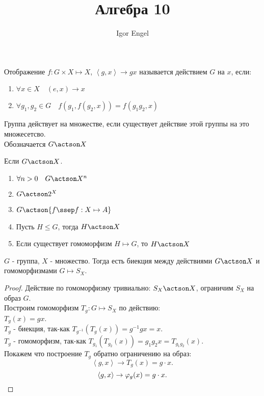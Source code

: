\documentclass[11pt, oneside]{article}   	%
\title{Алгебра 10}
\author{Igor Engel}
\date{}
\begin{document}
\maketitle
\section{} 
    \begin{definition}
        Отображение $f : G \times X \mapsto X$, $\left<g, x\right> \to gx$ называется действием $G$ на $x$, если:
        \begin{enumerate}
            \item $\forall{x\in X}\quad (e, x) \to x$
            \item $\forall{g_1, g_2\in G}\quad f(g_1, f(g_2, x)) = f(g_1g_2, x)$
        \end{enumerate}
    \end{definition}
    \begin{definition}
        Группа действует на множестве, если существует действие этой группы на это множесетсво.\\
        Обозначается $G\actson X$
    \end{definition}
    \begin{dlemma}
        Если $G\actson X$.
        \begin{enumerate}
            \item $\forall{n > 0}\quad G\actson X^{n}$
            \item $G\actson 2^{X}$
            \item $G\actson \{f \ssep f : X \mapsto A\} $
            \item Пусть $H \le G$, тогда $H\actson X$
            \item Если существует гомоморфизм $H \mapsto G$, то $H\actson X$
        \end{enumerate}
    \end{dlemma}
    \begin{theorem}
        $G$ -  группа, $X$ - множество. Тогда есть биекция между действиями $G\actson X$ и гомоморфизмами $G \mapsto S_{X}$.
        \begin{proof}
            Действие по гомоморфизму тривиально: $S_{X}\actson X$, ограничим $S_{X}$ на образ $G$.\\
            Построим гомоморфизм $T_{g} : G \mapsto S_{X}$ по действию:\\
            $T_g(x) = gx$.\\
            $T_g$ -  биекция, так-как $T_{g^{-1}}\left( T_{g}(x) \right) = g^{-1}gx=x $.\\
            $T_g$ -  гомоморфизм, так-как $T_{g_1}\left( T_{g_2}(x) \right) = g_1g_2x = T_{g_1g_2}(x)$.\\
            Покажем что построение $T_g$ обратно ограничению на образ:\\
            \[ \left<g, x\right> \to T_{g}(x) = g\cdot x .\]
            \[ \left<g, x\right> \to \varphi_{g}(x) = g\cdot x .\qedhere\] 
        \end{proof}
    \end{theorem}
\end{document}
